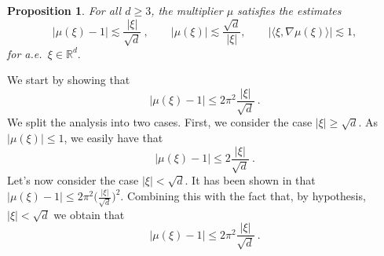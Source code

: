 \documentclass[a4paper, reqno]{amsart}
\newtheorem{proposition}[thm]{Proposition}
\theoremstyle{definition}
\newcommand{\R}{{\mathbb R}}
\begin{document}
\begin{proposition}\label{propo_estimate_for_mu}
For all $d\geq 3$, the multiplier  $\mu$ satisfies the estimates
\begin{equation*}
    |\mu(\xi)-1|\lesssim \frac{|\xi|}{\sqrt{d}}~, \qquad |\mu(\xi)|\lesssim \frac{\sqrt{d}}{|\xi|},\qquad
 |\langle \xi, \nabla \mu(\xi) \rangle | \lesssim 1,
\end{equation*}
for a.e.\ $\xi\in \R^d.$
\end{proposition}
\proof
We start by showing that
$$|\mu(\xi)-1|\leq 2\pi^2\frac{|\xi|}{\sqrt{d}}~.$$
We split the analysis into two cases. First, we consider the case $|\xi|\geq \sqrt{d}$. As $|\mu(\xi)|\leq 1$, we easily have that
$$|\mu(\xi)-1|\leq 2  \frac{|\xi|}{\sqrt{d}}~.$$
Let's now consider the case $|\xi|<\sqrt{d}$. It has been shown in \cite[Equation~4.9]{MSW24} that $|\mu(\xi)-1|\leq 2\pi^2 \big( \frac{|\xi|}{\sqrt{d}}\big)^{2}$. Combining this with the fact that, by hypothesis, $|\xi|<\sqrt{d}$ we obtain that
$$|\mu(\xi)-1|\leq  2\pi^2 \frac{|\xi|}{\sqrt{d}}~.$$
\end{document}
